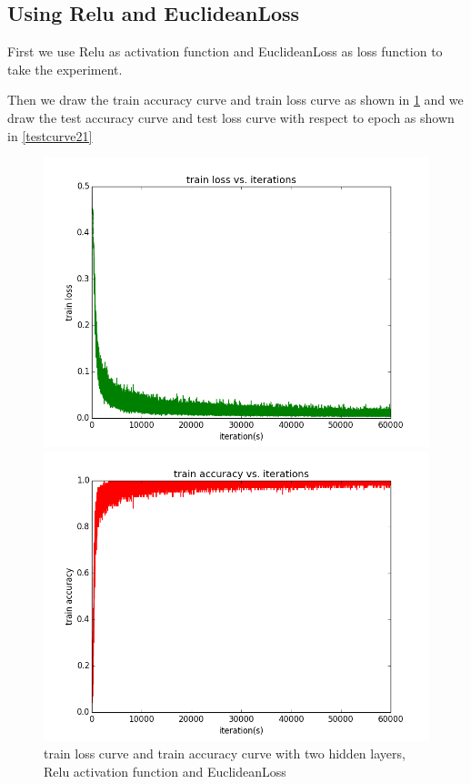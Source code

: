 \documentclass{elegantbook}
\begin{document}
\subsection{Using Relu and EuclideanLoss}
First we use Relu as activation function and EuclideanLoss as loss function to take the experiment.


Then we draw the train accuracy curve and train loss curve as shown in \ref{traincurve21} and we draw the test accuracy curve and test loss curve with respect to epoch as shown in \ref{testcurve21}
\begin{figure}[!ht]
	\centering
	\begin{minipage}[t]{0.45\textwidth}
		\centering
		\includegraphics[width=\textwidth]{trainloss2re}
	\end{minipage}
	\begin{minipage}[t]{0.45\textwidth}
		\centering
		\includegraphics[width=\textwidth]{trainacc2re}
	\end{minipage}
	\caption{\label{traincurve21}train loss curve and train accuracy curve with two hidden layers, Relu activation function and EuclideanLoss}
\end{figure}
\end{document}
